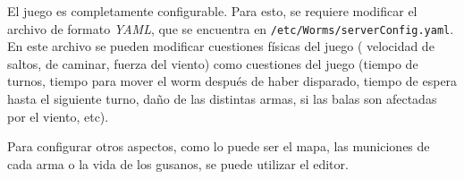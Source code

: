 El juego es completamente configurable. Para esto, se requiere modificar el archivo de formato \emph{YAML}, que se encuentra en \texttt{/etc/Worms/serverConfig.yaml}. En este archivo se pueden modificar cuestiones físicas del juego ( velocidad de saltos, de caminar, fuerza del viento) como cuestiones del juego (tiempo de turnos, tiempo para mover el worm después de haber disparado, tiempo de espera hasta el siguiente turno, daño de las distintas armas, si las balas son afectadas por el viento, etc).

Para configurar otros aspectos, como lo puede ser el mapa, las municiones de cada arma o la vida de los gusanos, se puede utilizar el editor.
